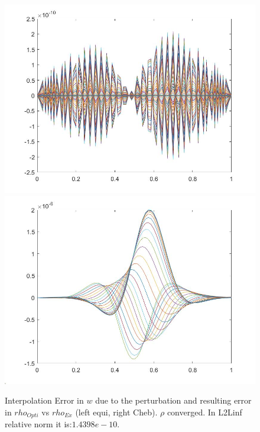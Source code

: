 \documentclass[11pt, a4paper]{article}
\theoremstyle{definition}
\begin{document}
    \begin{figure}[h]
		\includegraphics[scale=0.25]{ErrPert2a.jpg}
		\includegraphics[scale=0.25]{ErrrhoPert2a.jpg}
		\caption{Interpolation Error in $w$ due to the perturbation and resulting error in $rho_{Opti}$ vs $rho_{Ex}$ (left equi, right Cheb). $\rho$ converged. In L2Linf relative norm it is:$1.4398e-10$. }
		\label{Pert2}
	\end{figure}
	
\end{document}
